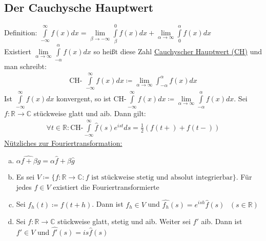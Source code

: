 \documentclass{article}
\begin{document}
\subsection{Der Cauchysche Hauptwert}
Definition: $ \int \limits_{-\infty}^\infty f(x) dx= \lim \limits_{\beta \to - \infty} \int \limits_\beta^0 f(x) dx + \lim \limits_{\alpha \to \infty} \int \limits_0^\alpha f(x) dx$ \\
Existiert $\lim \limits_{\alpha \to \infty} \int \limits_{-\alpha}^\alpha f(x) dx$ so heißt diese Zahl \underline{Cauchyscher Hauptwert (CH)} und man schreibt: 
\begin{align*}
    \text{CH- } \int \limits_{- \infty}^\infty f(x) dx \coloneqq \lim \limits_{\alpha \to \infty} \int_{-\alpha}^\alpha f(x) dx
\end{align*}
Ist $\int \limits_{-\infty}^{\infty} f(x) dx$ konvergent, so ist $\text{CH-} \int \limits_{-\infty}^\infty f(x) dx \coloneqq \lim \limits_{\alpha \to \infty} \int \limits_{-\alpha}^\alpha f(x) dx$.
Sei $f: \mathbb{R} \to \mathbb{C}$ stückweise glatt und aib. Dann gilt:
\begin{align*}
    \forall t \in \mathbb{R}: \text{CH-}\int \limits_{-\infty}^\infty \widehat{f}(s)e^{ist} ds = \frac{1}{2} (f(t+) + f(t-))
\end{align*}
\underline{Nützliches zur Fouriertransformation:}
\begin{enumerate} [a)]
    \item $\widehat{\alpha f + \beta g} = \alpha \widehat{f} + \beta \widehat{g}$
    \item Es sei $V \coloneqq \{ f: \mathbb{R} \to \mathbb{C}: f \text{ ist stückweise stetig und absolut integrierbar}\}$. Für jedes $f \in V$ existiert die Fouriertransformierte
    \item Sei $f_h(t) \coloneqq f(t+h)$. Dann ist $f_h \in V$ und $\widehat{f_h}(s) = e^{ish} \widehat{f}(s) \text{ } (s \in \mathbb{R})$
    \item Sei $f: \mathbb{R} \to \mathbb{C}$ stückweise glatt, stetig und aib. Weiter sei $f'$ aib. Dann ist $f' \in V$ und $\widehat{f'}(s) = is\widehat{f}(s)$
\end{enumerate}
\end{document}
